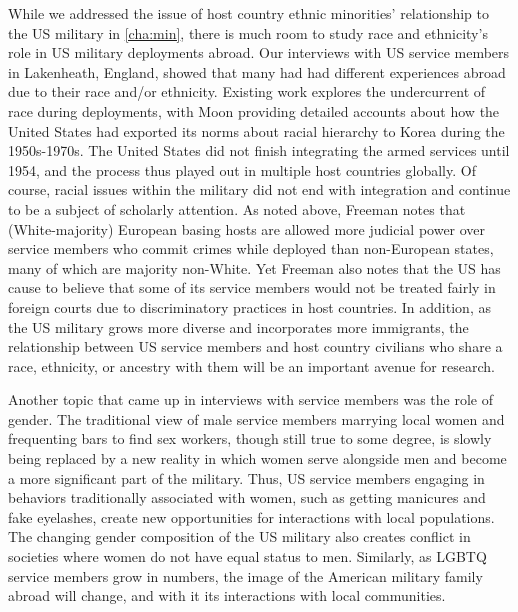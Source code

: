 While we addressed the issue of host country ethnic minorities' relationship to the US military in \ref{cha:min}, there is much room to study race and ethnicity's role in US military deployments abroad. Our interviews with US service members in Lakenheath, England, showed that many had had different experiences abroad due to their race and/or ethnicity. Existing work explores the undercurrent of race during deployments, with Moon providing detailed accounts about how the United States had exported its norms about racial hierarchy to Korea during the 1950s-1970s.\cite{Moon1997} The United States did not finish integrating the armed services until 1954, and the process thus played out in multiple host countries globally. Of course, racial issues within the military did not end with integration and continue to be a subject of scholarly attention. As noted above, Freeman notes that (White-majority) European basing hosts are allowed more judicial power over service members who commit crimes while deployed than non-European states, many of which are majority non-White. Yet Freeman also notes that the US has cause to believe that some of its service members would not be treated fairly in foreign courts due to discriminatory practices in host countries.\cite{Freeman2021} In addition, as the US military grows more diverse and incorporates more immigrants, the relationship between US service members and host country civilians who share a race, ethnicity, or ancestry with them will be an important avenue for research. 

Another topic that came up in interviews with service members was the role of gender. The traditional view of male service members marrying local women and frequenting bars to find sex workers, though still true to some degree, is slowly being replaced by a new reality in which women serve alongside men and become a more significant part of the military. Thus, US service members engaging in behaviors traditionally associated with women, such as getting manicures and fake eyelashes, create new opportunities for interactions with local populations. The changing gender composition of the US military also creates conflict in societies where women do not have equal status to men. Similarly, as LGBTQ service members grow in numbers, the image of the American military family abroad will change, and with it its interactions with local communities. %


